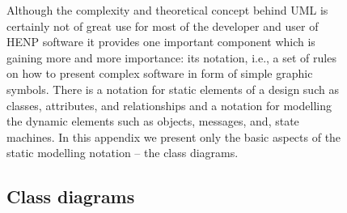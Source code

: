 \documentclass[twoside]{article}
\begin{document}
\begin{figure}[htb]
\begin{center}
Although the complexity and theoretical concept behind UML is
certainly not of great use for most of the developer and user of HENP
software it provides one important component which is gaining more and
more importance: its notation, i.e., a set of rules on how to present
complex software in form of simple graphic symbols.  There is a
notation for static elements of a design such as classes, attributes,
and relationships and a notation for modelling the dynamic elements
such as objects, messages, and, state machines. In this appendix we
present only the basic aspects of the static modelling notation -- the
class diagrams.   

\subsection{Class diagrams}


\end{center}
\end{figure}
\end{document}

